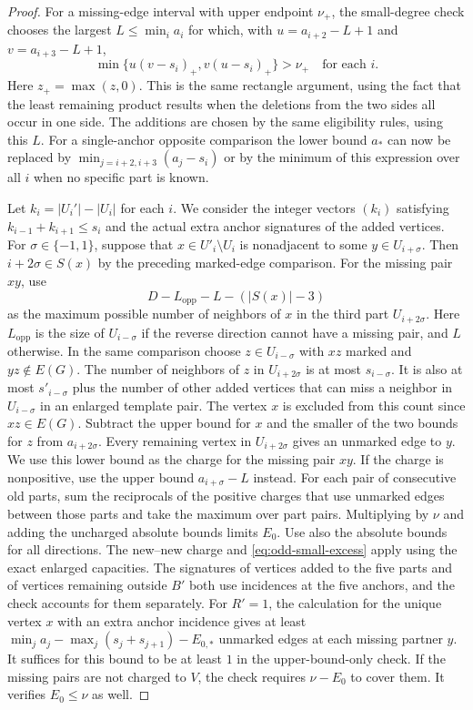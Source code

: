 \documentclass[preprint,11pt,numbers]{elsarticle-arxiv}
\numberwithin{equation}{section}
\theoremstyle{definition}
\begin{document}
\begin{proof}
For a missing-edge interval with upper endpoint $\nu_+$, the small-degree
check chooses the largest $L\leq\min_i a_i$ for which, with
$u=a_{i+2}-L+1$ and $v=a_{i+3}-L+1$,
\[
 \min\{u(v-s_i)_+,v(u-s_i)_+\}>\nu_+\quad\text{for each }i .
\]
Here $z_+=\max(z,0)$. This is the same rectangle argument,
using the fact that the least remaining product results when the
deletions from the two sides all occur in one side. The additions
are chosen by the same eligibility rules, using this $L$. For a
single-anchor opposite comparison the lower bound $a_*$ can now
be replaced by $\min_{j=i+2,i+3}(a_j-s_i)$ or by the minimum of
this expression over all $i$ when no specific part is known.

Let $k_i=|U_i'|-|U_i|$ for each $i$. We consider the integer vectors $(k_i)$ satisfying $k_{i-1}+k_{i+1}\leq s_i$
and the actual extra anchor signatures of the added vertices.
For $\sigma\in\{-1,1\}$, suppose that $x\in U'_i\setminus U_i$
is nonadjacent to some $y\in U_{i+\sigma}$. Then
$i+2\sigma\in S(x)$ by the preceding marked-edge comparison.
For the missing pair $xy$, use
\[
 D-L_{\mathrm{opp}}-L-(|S(x)|-3)
\]
as the maximum possible number of neighbors of $x$ in the third
part $U_{i+2\sigma}$. Here $L_{\mathrm{opp}}$ is the size of
$U_{i-\sigma}$ if the reverse direction cannot have a missing
pair, and $L$ otherwise. In the same comparison choose
$z\in U_{i-\sigma}$ with $xz$ marked and $yz\notin E(G)$. The
number of neighbors of $z$ in $U_{i+2\sigma}$ is at most
$s_{i-\sigma}$. It is also at most $s'_{i-\sigma}$ plus the
number of other added vertices that can miss a neighbor in
$U_{i-\sigma}$ in an enlarged template pair. The vertex $x$ is
excluded from this count since $xz\in E(G)$. Subtract the upper
bound for $x$ and the smaller of the two bounds for $z$ from
$a_{i+2\sigma}$. Every remaining vertex in $U_{i+2\sigma}$ gives
an unmarked edge to $y$. We use this lower bound as the charge for
the missing pair $xy$. If the charge is
nonpositive, use the upper bound $a_{i+\sigma}-L$ instead.
For each pair of consecutive old parts, sum the reciprocals of the
positive charges that use unmarked edges between those parts and take the maximum over part pairs. Multiplying by $\nu$
and adding the uncharged absolute bounds limits $E_0$. Use also the
absolute bounds for all directions. The new--new charge and
\eqref{eq:odd-small-excess} apply using the exact enlarged capacities.
The signatures of vertices added to the five parts and of vertices remaining
outside $B'$ both use incidences at the five anchors, and the
check accounts for them separately. For $R'=1$, the calculation
for the unique vertex $x$ with an extra anchor incidence gives at
least $\min_j a_j-\max_j(s_j+s_{j+1})-E_{0,*}$ unmarked edges at each
missing partner $y$. It suffices for this bound to be at least $1$
in the upper-bound-only check. If the missing pairs are not charged
to $V$, the check requires $\nu-E_0$ to cover them. It verifies
$E_0\leq \nu$ as well.


\end{proof}
\end{document}
